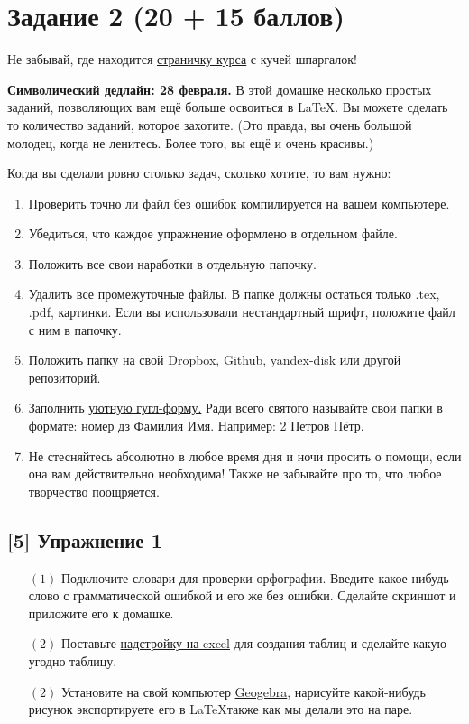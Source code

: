 \documentclass[12pt, a4paper, oneside]{article}
\begin{document}
\section*{Задание 2  (20 + 15 баллов)}

Не забывай, где находится  \href{https://fulyankin.github.io/LaTeX/}{страничку курса} с кучей шпаргалок!

\textbf{Символический дедлайн:  28 февраля.} В этой домашке несколько простых заданий, позволяющих вам ещё больше освоиться в \LaTeX{.}  Вы можете сделать то количество заданий, которое захотите. (Это правда, вы очень большой молодец, когда не ленитесь. Более того, вы ещё и очень красивы.) 

Когда вы сделали ровно столько задач, сколько хотите, то вам нужно:

\begin{enumerate}
\item Проверить точно ли файл без ошибок компилируется на вашем компьютере.
\item Убедиться, что каждое упражнение оформлено в отдельном файле.
\item Положить все свои наработки в отдельную папочку.
\item Удалить все промежуточные файлы. В папке должны остаться только .tex, .pdf, картинки. Если вы использовали нестандартный шрифт, положите файл с ним в папочку.
\item Положить папку на	свой	Dropbox, Github,	yandex-disk	или другой	репозиторий.
\item Заполнить	\href{https://docs.google.com/forms/d/e/1FAIpQLSe11kxKVfv07iCL1E9yNX7ll9swKImiVwRr1H70lslGzInRSg/viewform}{уютную гугл-форму.} Ради всего святого называйте свои папки в формате: номер дз Фамилия Имя. Например: 2 Петров Пётр.
\item Не стесняйтесь абсолютно в любое время дня и ночи просить о помощи, если она вам действительно необходима! Также не забывайте про то, что любое творчество поощряется. 
\end{enumerate}

\subsection*{[5]  Упражнение 1 }

\begin{itemize}
	\item[$(1)$]  Подключите словари для проверки орфографии. Введите какое-нибудь слово с грамматической ошибкой и его же без ошибки. Сделайте скриншот и приложите его к домашке. 
	\item [$(2)$]  Поставьте \href{https://www.ctan.org/pkg/excel2latex}{надстройку на excel} для создания таблиц и сделайте какую угодно таблицу. 
	\item[$(2)$]  Установите на свой компьютер \href{https://www.geogebra.org/download}{Geogebra}, нарисуйте какой-нибудь рисунок экспортируете его в \LaTeX также как мы делали это на паре. 
\end{itemize}
\end{document}
